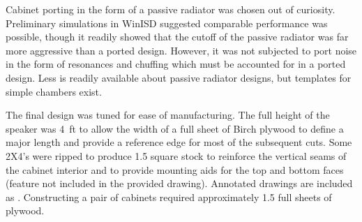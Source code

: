 \documentclass{StdTemplate} %
\begin{document}
%
Cabinet porting in the form of a passive radiator was chosen out of curiosity. Preliminary simulations in WinISD suggested comparable performance was possible, though it readily showed that the cutoff of the passive radiator was far more aggressive than a ported design. However, it was not subjected to port noise in the form of resonances and chuffing which must be accounted for in a ported design. Less is readily available about passive radiator designs, but templates for simple chambers exist.\par
%
The final design was tuned for ease of manufacturing. The full height of the speaker was \SI{4}{ft} to allow the width of a full sheet of Birch plywood to define a major length and provide a reference edge for most of the subsequent cuts. Some 2X4’s were ripped to produce \SI{1.5}{\in} square stock to reinforce the vertical seams of the cabinet interior and to provide mounting aids for the top and bottom faces (feature not included in the provided drawing). Annotated drawings are included as . Constructing a pair of cabinets required approximately 1.5 full sheets of plywood.\par
%
\end{document}
